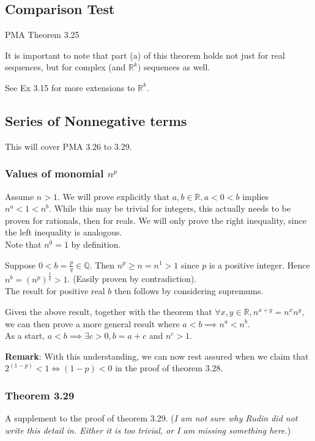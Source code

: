 \documentclass{article}
\begin{document}
\subsection{Comparison Test}
PMA Theorem 3.25

It is important to note that part (a) of this theorem holds not just for real sequences, but for complex (and $\mathbb{R}^k)$ sequences as well.

See Ex 3.15 for more extensions to $\mathbb{R}^k$.

\subsection{Series of Nonnegative terms}
This will cover PMA 3.26 to 3.29.

\subsubsection{Values of monomial $n^p$}
Assume $n > 1$.
We will prove explicitly that $a,b\in \mathbb{R}, a < 0 < b$ implies $n^a < 1 < n^b$. While this may be trivial for integers, this actually needs to be proven for rationals, then for reals. We will only prove the right inequality, since the left inequality is analogous.\\
Note that $n^0=1$ by definition.

Suppose $0 < b=\frac{p}{q}\in \mathbb{Q}$. Then $n^p \geq n = n^1 > 1$ since $p$ is a positive integer. Hence $n^b=(n^p)^\frac{1}{q}>1$. (Easily proven by contradiction).\\
The result for positive real $b$ then follows by considering supremums.

Given the above result, together with the theorem that $\forall x,y\in \mathbb{R}, n^{x+y}=n^xn^y$, we can then prove a more general result where $a < b\implies n^a < n^b$.\\
As a start, $a < b\implies \exists c > 0, b = a + c$ and $n^c > 1$.


\textbf{Remark}: With this understanding, we can now rest assured when we claim that $2^{(1-p)}<1 \iff (1-p) < 0$ in the proof of theorem 3.28.

\subsubsection{Theorem 3.29}
A supplement to the proof of theorem 3.29. (\textit{I am not sure why Rudin did not write this detail in. Either it is too trivial, or I am missing something here.})
\end{document}
